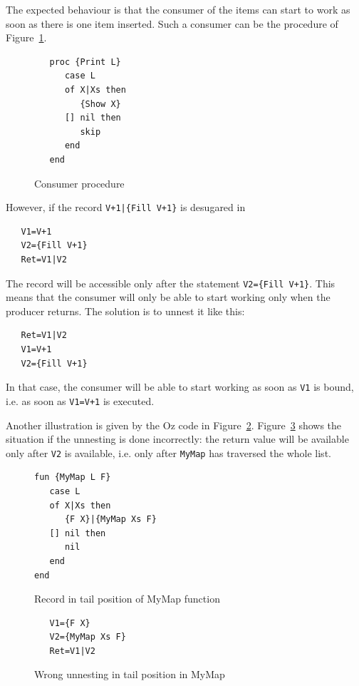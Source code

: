\documentclass[a4paper]{memoir}
\begin{document}
The expected behaviour is that the consumer of the items can start to work as
soon as there is one item inserted. Such a consumer can be the procedure of
Figure~\ref{fig:unnester:consumer}.
\begin{figure}[h]
\begin{lstlisting}
   proc {Print L}
      case L
      of X|Xs then
         {Show X}
      [] nil then
         skip
      end
   end
\end{lstlisting}
\caption{Consumer procedure}
\label{fig:unnester:consumer}
\end{figure}


However, if the record \lstinline!V+1|{Fill V+1}! is desugared in 
\begin{lstlisting}
   V1=V+1
   V2={Fill V+1}
   Ret=V1|V2
\end{lstlisting}
The record will be accessible only after the statement 
\lstinline!V2={Fill V+1}!. This means that the consumer will only be able to
start working only when the producer returns.
The solution is to unnest it like this:
\begin{lstlisting}
   Ret=V1|V2
   V1=V+1
   V2={Fill V+1}
\end{lstlisting}
In that case, the consumer will be able to start working as soon as
\lstinline!V1! is bound, i.e. as soon as \lstinline!V1=V+1! is executed.

Another illustration is given by the Oz code in Figure~\ref{fig:unnester:mymap}. Figure~\ref{fig:unnester:wrongmymap} shows
the situation if the unnesting is done incorrectly: the return value
will be available only after \lstinline!V2! is available, i.e. only after
\lstinline!MyMap! has
traversed the whole list.

\begin{figure}[h]
\begin{lstlisting}
fun {MyMap L F}
   case L
   of X|Xs then
      {F X}|{MyMap Xs F}
   [] nil then
      nil
   end
end
\end{lstlisting}
\caption{Record in tail position of MyMap function}
\label{fig:unnester:mymap}
\end{figure}


\begin{figure}[h]
\begin{lstlisting}
   V1={F X}
   V2={MyMap Xs F}
   Ret=V1|V2
\end{lstlisting}
\caption{Wrong unnesting in tail position in MyMap}
\label{fig:unnester:wrongmymap}
\end{figure}
\end{document}
